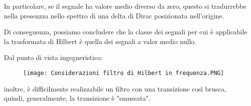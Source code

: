 In particolare, se il segnale ha valore medio diverso da zero, questo si tradurrebbe nella presenzza nello spettro di una delta di Dirac posizionata nell'origine. \newline 

Di conseguenza, possiamo concludere che la classe dei segnali per cui è applicabile la trasformata di Hilbert è quella dei segnali a valor medio nullo. \newline 

Dal punto di vista ingegneristico: 

\begin{figure}[h]
    \centering
    \texttt{[image: Considerazioni filtro di Hilbert in frequenza.PNG]}
\end{figure}  

inoltre, è difficilmente realizzabile un filtro con una transizione così brusca, quindi, 
generalmente, la transizione è "smussata". \newline 

\newpage